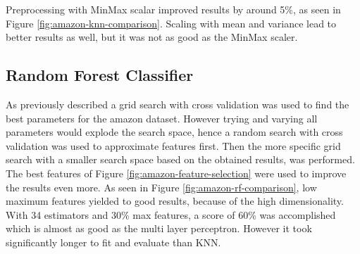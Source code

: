 Preprocessing with MinMax scalar improved results by around 5\%, as seen in Figure \ref{fig:amazon-knn-comparison}.
Scaling with mean and variance lead to better results as well, but it was not as good as the MinMax scaler.




\subsection{Random Forest Classifier}

As previously described a grid search with cross validation was used to find the best parameters for the amazon dataset.
However trying and varying all parameters would explode the search space, hence a random search with cross validation was used to approximate features first.
Then the more specific grid search with a smaller search space based on the obtained results, was performed.
The best features of Figure \ref{fig:amazon-feature-selection} were used to improve the results even more. 
As seen in Figure \ref{fig:amazon-rf-comparison}, low maximum features yielded to good results, because of the high dimensionality.
With 34 estimators and 30\% max features, a score of 60\% was accomplished which is almost as good as the multi layer perceptron.
However it took significantly longer to fit and evaluate than KNN.



